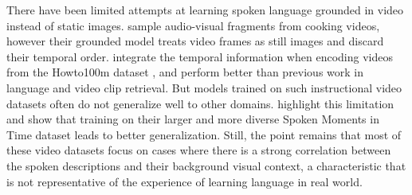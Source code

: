 There have been limited attempts at learning spoken language grounded in video instead of static images. 
\citet{boggust2019grounding} sample audio-visual fragments from cooking videos, however their grounded model treats video frames as still images and discard their temporal order.
\citet{rouditchenko2020avlnet} integrate the temporal information when encoding videos from the Howto100m dataset \cite{miech2019howto100m}, and perform better than previous work in language and video clip retrieval. 
But models trained on such instructional video datasets often do not generalize well to other domains. \citet{monfort2021spokenmoments} highlight this limitation and show that training on their larger and more diverse Spoken Moments in Time dataset leads to better generalization.
Still, the point remains that most of these video datasets focus on cases where there is a strong correlation between the spoken descriptions and their background visual context, a characteristic that is not representative of the experience of learning language in real world.

